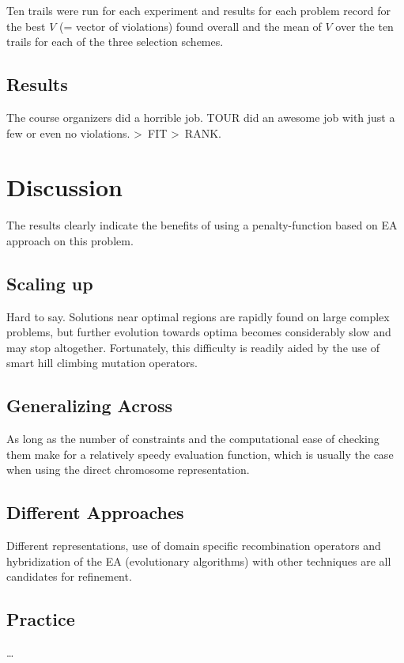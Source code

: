 \documentclass[12pt]{book}
\begin{document}
Ten trails were run for each experiment and results for each problem record for the best $V$ (= vector of violations) found overall and the mean of $V$ over the ten trails for each of the three selection schemes.

\subsection{Results}
The course organizers did a horrible job. TOUR did an awesome job with just a few or even no violations. \textgreater\ FIT \textgreater\ RANK.

\section{Discussion}
The results clearly indicate the benefits of using a penalty-function based on EA approach on this problem.

\subsection{Scaling up}
Hard to say. Solutions near optimal regions are rapidly found on large complex problems, but further evolution towards optima becomes considerably slow and may stop altogether. Fortunately, this difficulty is readily aided by the use of smart hill climbing mutation operators.

\subsection{Generalizing Across}
As long as the number of constraints and the computational ease of checking them make for a relatively speedy evaluation function, which is usually the case when using the direct chromosome representation.

\subsection{Different Approaches}
Different representations, use of domain specific recombination operators and hybridization of the EA (evolutionary algorithms) with other techniques are all candidates for refinement.

\subsection{Practice}
\dots
\end{document}
